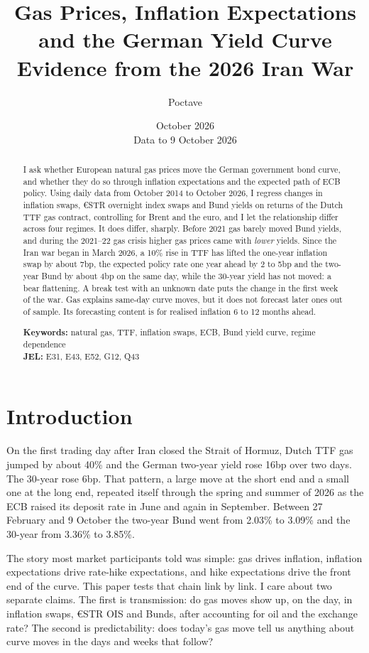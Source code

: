 \documentclass[11pt,a4paper]{article}
\title{\textbf{Gas Prices, Inflation Expectations and the German Yield Curve}\\[4pt]\large Evidence from the 2026 Iran War}
\author{Poctave}
\date{October 2026\\[2pt]\small Data to 9 October 2026}
\begin{document}
\maketitle
\thispagestyle{empty}

\begin{abstract}
\noindent I ask whether European natural gas prices move the German government bond curve, and whether they do so
through inflation expectations and the expected path of ECB policy. Using daily data from October 2014 to October
2026, I regress changes in inflation swaps, \euro{}STR overnight index swaps and Bund yields on returns of the Dutch
TTF gas contract, controlling for Brent and the euro, and I let the relationship differ across four regimes. It does
differ, sharply. Before 2021 gas barely moved Bund yields, and during the 2021--22 gas crisis higher gas prices came
with \emph{lower} yields. Since the Iran war began in March 2026, a 10\% rise in TTF has lifted the one-year
inflation swap by about 7bp, the expected policy rate one year ahead by 2 to 5bp and
the two-year Bund by about 4bp on the same day, while the 30-year yield has not moved: a bear flattening. A
break test with an unknown date puts the change in the first week of the war. Gas explains same-day curve moves, but
it does not forecast later ones out of sample. Its forecasting content is for realised inflation 6 to 12 months ahead.
\medskip

\noindent\textbf{Keywords:} natural gas, TTF, inflation swaps, ECB, Bund yield curve, regime dependence\\
\textbf{JEL:} E31, E43, E52, G12, Q43
\end{abstract}

\newpage
\section{Introduction}

On the first trading day after Iran closed the Strait of Hormuz, Dutch TTF gas jumped by about 40\% and the German
two-year yield rose 16bp over two days. The 30-year rose 6bp. That pattern, a large move at the short
end and a small one at the long end, repeated itself through the spring and summer of 2026 as the ECB raised its
deposit rate in June and again in September. Between 27 February and 9 October the two-year Bund went from
2.03\% to 3.09\% and the 30-year from 3.36\% to 3.85\%.

The story most market participants told was simple: gas drives inflation, inflation expectations drive rate-hike
expectations, and hike expectations drive the front end of the curve. This paper tests that chain link by link. I
care about two separate claims. The first is transmission: do gas moves show up, on the day, in inflation swaps,
\euro{}STR OIS and Bunds, after accounting for oil and the exchange rate? The second is predictability: does today's
gas move tell us anything about curve moves in the days and weeks that follow?
\end{document}
